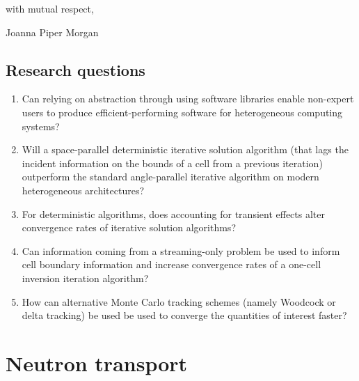 \hfill

with mutual respect,

Joanna Piper Morgan

\subsection{Research questions}
\begin{enumerate}
    \item Can relying on abstraction through using software libraries enable non-expert users to produce efficient-performing software for heterogeneous computing systems?
    \item Will a space-parallel deterministic iterative solution algorithm (that lags the incident information on the bounds of a cell from a previous iteration) outperform the standard angle-parallel iterative algorithm on modern heterogeneous architectures?
    \item For deterministic algorithms, does accounting for transient effects alter convergence rates of iterative solution algorithms?
    \item Can information coming from a streaming-only problem be used to inform cell boundary information and increase convergence rates of a one-cell inversion iteration algorithm?
    \item How can alternative Monte Carlo tracking schemes (namely Woodcock or delta tracking) be used be used to converge the quantities of interest faster?
\end{enumerate}


\section{Neutron transport}

